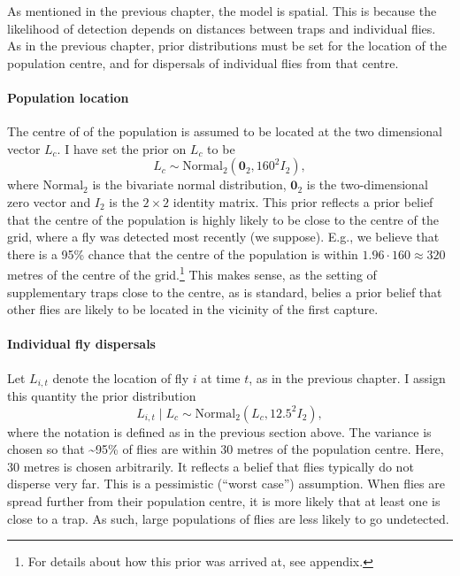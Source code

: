 \documentclass[
  oneside]{book}
\begin{document}
As mentioned in the previous chapter, the model is spatial. This is because the likelihood of detection depends on distances between traps and individual flies. As in the previous chapter, prior distributions must be set for the location of the population centre, and for dispersals of individual flies from that centre.

\hypertarget{population-location}{%
\paragraph{Population location}\label{population-location}}

The centre of of the population is assumed to be located at the two dimensional vector \(L_c\). I have set the prior on \(L_c\) to be
\[
L_c \sim \mathrm {Normal}_2 (\mathbf 0_2, 160^2 I_2),
\]
where \(\mathrm{Normal}_2\) is the bivariate normal distribution, \(\mathbf 0_2\) is the two-dimensional zero vector and \(I_2\) is the \(2 \times 2\) identity matrix. This prior reflects a prior belief that the centre of the population is highly likely to be close to the centre of the grid, where a fly was detected most recently (we suppose). E.g., we believe that there is a 95\% chance that the centre of the population is within \(1.96 \cdot 160 \approx 320\) metres of the centre of the grid.\footnote{For details about how this prior was arrived at, see appendix.} This makes sense, as the setting of supplementary traps close to the centre, as is standard, belies a prior belief that other flies are likely to be located in the vicinity of the first capture.

\hypertarget{individual-fly-dispersals}{%
\paragraph{Individual fly dispersals}\label{individual-fly-dispersals}}

Let \(L_{i, t}\) denote the location of fly \(i\) at time \(t\), as in the previous chapter. I assign this quantity the prior distribution \[L_{i, t} \mid L_c \sim \mathrm {Normal}_2 (L_c, 12.5^2 I_2),\] where the notation is defined as in the previous section above. The variance is chosen so that \textasciitilde95\% of flies are within 30 metres of the population centre. Here, 30 metres is chosen arbitrarily. It reflects a belief that flies typically do not disperse very far. This is a pessimistic (``worst case'') assumption. When flies are spread further from their population centre, it is more likely that at least one is close to a trap. As such, large populations of flies are less likely to go undetected.
\end{document}
